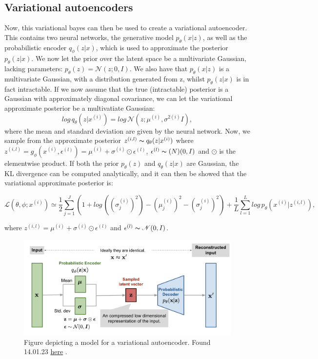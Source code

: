 \subsection*{Variational autoencoders}
Now, this variational bayes can then be used to create a variational autoencoder. This contains two neural networks, the generative model $p_{\theta}(x|z)$,
as well as the probabilistic encoder $q_{\phi}(z|x)$, which is used to approximate the posterior $p_{\theta}(z|x)$. We now let the prior over 
 the latent space be a multivariate Gaussian, lacking parameters: $p_{\theta}(z) = \mathcal{N}(z;0,I)$. We also have that $p_{\theta}(x|z)$ is a multivariate Gaussian,
with a distribution generated from z, whilst $p_{\theta}(z|x)$ is in fact intractable. If we now assume that the true (intractable) posterior 
is a Gaussian with approximately diagonal covariance, we can let the variational approximate posterior be a multivatiate Gaussian:
\begin{equation}
    log\, q_{\theta}(z|x^{(i)}) = log\, \mathcal{N}(z;\mu^{(i)},\sigma^{2(i)}I),
\end{equation}
where the mean and standard deviation are given by the neural network. Now, we sample from the approximate posterior $z^{(i,l)} \thicksim q_{\theta}(z|x^{(i)})$
where $z^{(i,l)} = g_{\phi}(x^{(i)}, \epsilon^{(l)}) = \mu^{(i)} + \sigma^{(i)} \odot \epsilon^{(l)}$, $\epsilon^{(l)} \thicksim \mathcal(N)(0,I)$ and $\odot$
is the elementwise product. If both the prior $p_{\theta}(z)$ and $q_{\theta}(z|x)$ are Gaussian, the KL divergence can be computed analytically, and it 
can then be showed\cite{VAE} that the variational approximate posterior is:

\begin{equation}\label{eq:loss_vae}
    \mathcal{L}(\theta, \phi;x^{(i)}) \simeq \frac{1}{2}\sum_{j=1}^{J}(1 + log\, ((\sigma^{(i)}_{j})^2) - (\mu^{(i)}_{j})^2 - (\sigma^{(i)}_{j})^2) +\frac{1}{L}\sum_{l=1}^{L}log\, p_{\theta}(x^{(i)}|z^{(i,l)}),
\end{equation}

where $z^{(i,l)} = \mu^{(i)} + \sigma^{(i)} \odot \epsilon^{(l)}$ and $ \epsilon^{(l)} \thicksim \mathcal{N}(0,I)$. 




\begin{figure}[H]
    \includegraphics[width=\linewidth]{Figures/Machinelearning/vae-gaussian.png}
    \caption{Figure depicting a model for a variational autoencoder. Found 14.01.23 \href{https://lilianweng.github.io/posts/2018-08-12-vae/vae-gaussian.png}{here} \cite{weng2018VAE}. }
    \label{fig:vae}
\end{figure}

